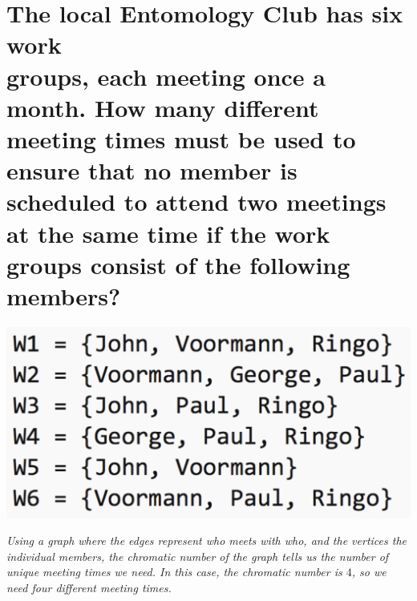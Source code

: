 \documentclass{article}
\begin{document}
\section{The local Entomology Club has six work \\ groups, each meeting once a month. How many different meeting times must be used to ensure that no member is scheduled to attend two meetings at the same time if the work groups consist of the following members?}
\begin{center}
    \includegraphics[scale=0.33]{problem6.png}
\end{center}
\begin{center}
\end{center}
\hspace{1cm}\textit{Using a graph where the edges represent who meets with who, and the vertices the individual members, the chromatic number of the graph tells us the number of unique meeting times we need. In this case, the chromatic number is $4$, so we need four different meeting times.}
\clearpage
\end{document}
